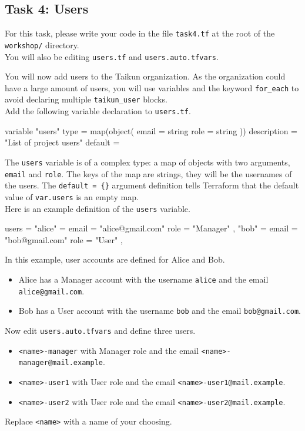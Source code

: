 \subsection{Task 4: Users}\label{sec:task4}

\begin{note}
For this task, please write your code in the file \texttt{task4.tf}
at the root of the \texttt{workshop/} directory.\\
You will also be editing \texttt{users.tf} and \texttt{users.auto.tfvars}.
\end{note}

You will now add users to the Taikun organization.
As the organization could have a large amount of users, you will use variables
and the keyword \texttt{for\_each} to avoid declaring multiple \texttt{taikun\_user}
blocks.\\

Add the following variable declaration to \texttt{users.tf}.
\begin{tf}
variable "users" {
  type = map(object({
    email = string
    role  = string
  }))
  description = "List of project users"
  default     = {}
}
\end{tf}

The \texttt{users} variable is of a complex type:
a map of objects with two arguments, \texttt{email} and \texttt{role}.
The keys of the map are strings, they will be the usernames of the users.
The \texttt{default = \{\}} argument definition tells Terraform that the default value of \texttt{var.users} is an empty map.\\

Here is an example definition of the \texttt{users} variable.
\begin{tf}
users = {
  "alice" = {
    email = "alice@gmail.com"
    role  = "Manager"
  },
  "bob" = {
    email = "bob@gmail.com"
    role  = "User"
  },
}
\end{tf}
In this example, user accounts are defined for Alice and Bob.
\begin{itemize}
  \item Alice has a Manager account with the username \texttt{alice} and the email \texttt{alice@gmail.com}.
  \item Bob has a User account with the username \texttt{bob} and the email \texttt{bob@gmail.com}.
\end{itemize}
Now edit \texttt{users.auto.tfvars} and define three users.
\begin{itemize}
  \item \texttt{<name>-manager} with Manager role and the email \texttt{<name>-manager@mail.example}.
  \item \texttt{<name>-user1} with User role and the email \texttt{<name>-user1@mail.example}.
  \item \texttt{<name>-user2} with User role and the email \texttt{<name>-user2@mail.example}.
\end{itemize}
Replace \texttt{<name>} with a name of your choosing.\\

